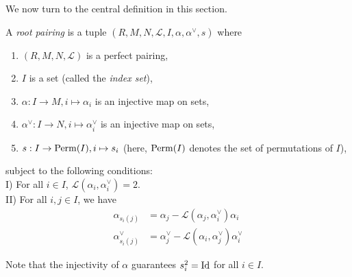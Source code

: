 We now turn to the central definition in this section.
\begin{definition}
    \label{def:root-pairing}
   \leanok
    A {\it root pairing} is a tuple $(R,M,N,\mathcal{L},I,\alpha, \alpha^\vee,s)$ where
       \begin{enumerate} 
        \item $(R,M,N,\mathcal{L})$ is a perfect pairing,
        \item  $I$ is a set (called the {\it index set}),
        \item $\alpha : I \to M, i \mapsto \alpha_i$ is an injective map on sets,
        \item $\alpha^\vee : I \to N, i \mapsto \alpha_i^\vee$ is an injective map on sets,
        \item $s : I \to {\rm Perm}(I), i \mapsto s_i$ (here, ${\rm Perm}(I)$ denotes the set of permutations of $I$),
       \end{enumerate}
       subject to the following conditions:\\
       I) For all $i \in I$, $\mathcal{L}(\alpha_i,\alpha^\vee_i) = 2$. \\
       II) For all $i,j \in I$, we have
            \begin{align*}
            \alpha_{s_i(j)} &= \alpha_j - \mathcal{L}(\alpha_j,\alpha^\vee_i)\alpha_i \\
            \alpha_{s_i(j)}^\vee &= \alpha_j^\vee - \mathcal{L}(\alpha_i,\alpha^\vee_j)\alpha_i^\vee
            \end{align*}
\end{definition}
Note that the injectivity of $\alpha$ guarantees $s_i^2 = {\rm Id}$ for all $i \in I$.

